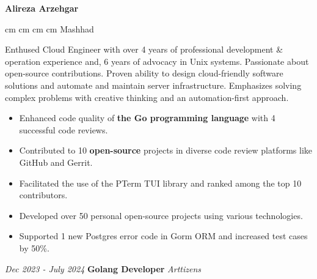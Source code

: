\documentclass{engineercv}
\begin{document}
\begin{center}
  \textbf{\fontsize{24 pt}{24 pt}\selectfont Alireza Arzehgar}

  \vspace{0.2 cm}

  \scriptsize
  \mbox{}
   cm
  \mbox{}
   cm
  \mbox{}
   cm
  \mbox{}
   cm
  \mbox{{\color{black}\footnotesize\faMapMarker*}\hspace*{0.13cm}Mashhad}
\end{center}

Enthused Cloud Engineer with over 4 years of professional development \& operation experience and,
6 years of advocacy in Unix systems. Passionate about open-source contributions. Proven ability
to design cloud-friendly software solutions and automate and maintain server infrastructure. Emphasizes
solving complex problems with creative thinking and an automation-first approach.

\begin{itemize}
  \item Enhanced code quality of \textbf{the Go programming language} with 4 successful code reviews.
  \item Contributed to 10 \textbf{open-source} projects in diverse code review platforms like GitHub and Gerrit.
  \item Facilitated the use of the PTerm TUI library and ranked among the top 10 contributors.
  \item Developed over 50 personal open-source projects using various technologies.
  \item Supported 1 new Postgres error code in Gorm ORM and increased test cases by 50\%.
\end{itemize}

\begin{twocolentry}{\textit{Dec 2023 - July 2024}}
  \textbf{Golang Developer}
  \textit{Arttizens}
\end{twocolentry}
\end{document}
